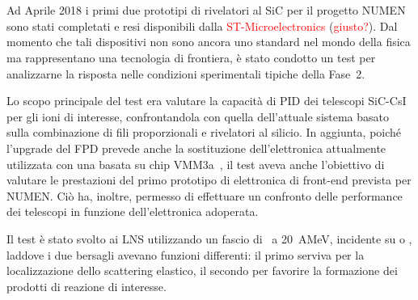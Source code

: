 \section{}

Ad Aprile 2018 i primi due prototipi di rivelatori al SiC per il progetto NUMEN sono stati completati e resi disponibili dalla \textcolor{red}{ST-Microelectronics} (\textcolor{red}{giusto?}). Dal momento che tali dispositivi non sono ancora uno standard nel mondo della fisica ma rappresentano una tecnologia di frontiera, è stato condotto un test per analizzarne la risposta nelle condizioni sperimentali tipiche della Fase~2.

Lo scopo principale del test era valutare la capacità di PID dei telescopi SiC-CsI per gli ioni di interesse, confrontandola con quella dell'attuale sistema basato sulla combinazione di fili proporzionali e rivelatori al silicio.
In aggiunta, poiché l'upgrade del FPD prevede anche la sostituzione dell'elettronica attualmente utilizzata con una basata su chip VMM3a~\cite{degeronimo:ieee13}, il test aveva anche l'obiettivo di valutare le prestazioni del primo prototipo di elettronica di front-end prevista per NUMEN.
Ciò ha, inoltre, permesso di effettuare un confronto delle performance dei telescopi in funzione dell'elettronica adoperata.

Il test è stato svolto ai LNS utilizzando un fascio di~ a 20~AMeV, incidente su  o , laddove i due bersagli avevano funzioni differenti: il primo serviva per la localizzazione dello scattering elastico, il secondo per favorire la formazione dei prodotti di reazione di interesse.




